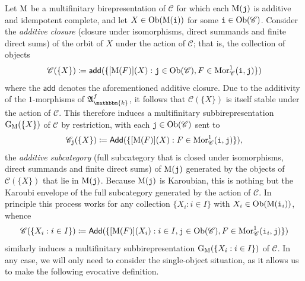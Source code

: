 \noindent Let $\textup{M}$ be a multifinitary birepresentation of $\mathscr{C}$ for which each $\textup{M}(\textnormal{\texttt{j}})$ is additive and idempotent complete, and let $X \in \textnormal{Ob}(\textup{M}(\textnormal{\texttt{i}}))$ for some $\textnormal{\texttt{i}} \in \textnormal{Ob}(\mathscr{C})$. Consider the {\em additive closure} (closure under isomorphisms, direct summands and finite direct sums) of the orbit of $X$ under the action of $\mathscr{C}$; that is, the collection of objects
\begin{align*}
\begin{split}
\mathscr{C}(\{X\}) \coloneqq \textsf{add}(\{[\textup{M}(F)](X) : \textnormal{\texttt{j}} \in \textnormal{Ob}(\mathscr{C}), F \in \textnormal{Mor}_\mathscr{C}^1(\textnormal{\texttt{i}}, \textnormal{\texttt{j}})\})
\end{split}
\end{align*}
\noindent where the $\textsf{add}$ denotes the aforementioned additive closure. Due to the additivity of the $1$-morphisms of $\mathfrak{A}_\mathbbm{k}^f$, it follows that $\mathscr{C}(\{X\})$ is itself stable under the action of $\mathscr{C}$. This therefore induces a multifinitary subbirepresentation $\textup{G}_\textup{M}(\{X\})$ of $\mathscr{C}$ by restriction, with each $\textnormal{\texttt{j}} \in \textnormal{Ob}(\mathscr{C})$ sent to
\begin{align*}
\begin{split}
\mathscr{C}_{\textnormal{\texttt{j}}}(\{X\}) \coloneqq \textsf{Add}(\{[\textup{M}(F)](X) : F \in \textnormal{Mor}_\mathscr{C}^1(\textnormal{\texttt{i}}, \textnormal{\texttt{j}})\}),
\end{split}
\end{align*}
\noindent the {\em additive subcategory} (full subcategory that is closed under isomorphisms, direct summands and finite direct sums) of $\textup{M}(\textnormal{\texttt{j}})$ generated by the objects of $\mathscr{C}(\{X\})$ that lie in $\textup{M}(\textnormal{\texttt{j}})$. Because $\textup{M}(\textnormal{\texttt{j}})$ is Karoubian, this is nothing but the Karoubi envelope of the full subcategory generated by the action of $\mathscr{C}$. In principle this process works for any collection $\{X_i : i \in I\}$ with $X_i \in \textnormal{Ob}(\textup{M}(\textnormal{\texttt{i}}_i))$, whence
\begin{align*}
\begin{split}
\mathscr{C}(\{X_i : i \in I\}) \coloneqq \textsf{Add}(\{[\textup{M}(F)](X_i) : i \in I, \textnormal{\texttt{j}} \in \textnormal{Ob}(\mathscr{C}), F \in \textnormal{Mor}_\mathscr{C}^1(\textnormal{\texttt{i}}_i, \textnormal{\texttt{j}})\})
\end{split}
\end{align*}
\noindent similarly induces a multifinitary subbirepresentation $\textup{G}_\textup{M}(\{X_i : i \in I\})$ of $\mathscr{C}$. In any case, we will only need to consider the single-object situation, as it allows us to make the following evocative definition.\\

